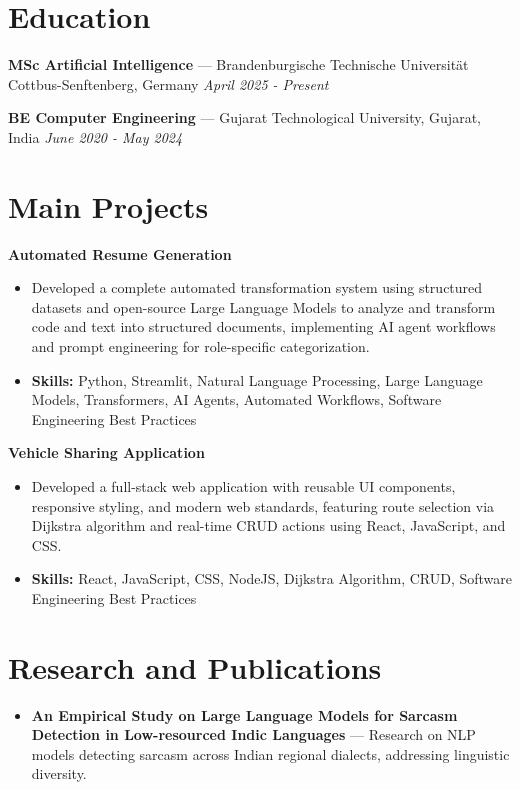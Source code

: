 \documentclass[a4paper,10pt]{article}
\begin{document}
\section*{Education}
\textbf{MSc Artificial Intelligence} — Brandenburgische Technische Universität Cottbus-Senftenberg, Germany \hfill \textit{April 2025 - Present}\par
\vspace{1.5pt}
\textbf{BE Computer Engineering} — Gujarat Technological University, Gujarat, India \hfill \textit{June 2020 - May 2024}\par

\section*{Main Projects}
\textbf{Automated Resume Generation}\par
\vspace{1pt}
\begin{itemize}
  \item Developed a complete automated transformation system using structured datasets and open-source Large Language Models to analyze and transform code and text into structured documents, implementing AI agent workflows and prompt engineering for role-specific categorization.
  \item \textbf{Skills:} Python, Streamlit, Natural Language Processing, Large Language Models, Transformers, AI Agents, Automated Workflows, Software Engineering Best Practices
\end{itemize}
\vspace{3pt}
\textbf{Vehicle Sharing Application}\par
\vspace{1pt}
\begin{itemize}
  \item Developed a full-stack web application with reusable UI components, responsive styling, and modern web standards, featuring route selection via Dijkstra algorithm and real-time CRUD actions using React, JavaScript, and CSS.
  \item \textbf{Skills:} React, JavaScript, CSS, NodeJS, Dijkstra Algorithm, CRUD, Software Engineering Best Practices
\end{itemize}

\section*{Research and Publications}
\begin{itemize}
\item \textbf{An Empirical Study on Large Language Models for Sarcasm Detection in Low-resourced Indic Languages} — Research on NLP models detecting sarcasm across Indian regional dialects, addressing linguistic diversity.
\end{itemize}
\end{document}
